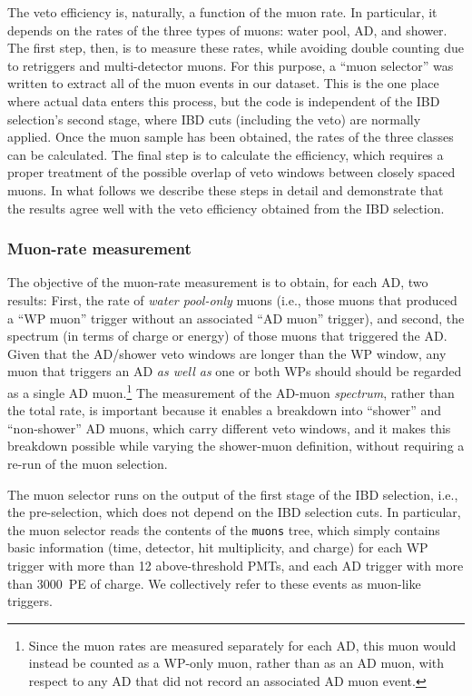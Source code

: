 \documentclass[../thesis.tex]{subfiles}
\begin{document}
The veto efficiency is, naturally, a function of the muon rate. In particular, it depends on the rates of the three types of muons: water pool, AD, and shower. The first step, then, is to measure these rates, while avoiding double counting due to retriggers and multi-detector muons. For this purpose, a ``muon selector'' was written to extract all of the muon events in our dataset. This is the one place where actual data enters this process, but the code is independent of the IBD selection's second stage, where IBD cuts (including the veto) are normally applied. Once the muon sample has been obtained, the rates of the three classes can be calculated. The final step is to calculate the efficiency, which requires a proper treatment of the possible overlap of veto windows between closely spaced muons. In what follows we describe these steps in detail and demonstrate that the results agree well with the veto efficiency obtained from the IBD selection.

\subsubsection{Muon-rate measurement}%
\label{sec:cutVaryMuRate}

The objective of the muon-rate measurement is to obtain, for each AD, two results: First, the rate of \emph{water pool-only} muons (i.e., those muons that produced a ``WP muon'' trigger without an associated ``AD muon'' trigger), and second, the spectrum (in terms of charge or energy) of those muons that triggered the AD\@. Given that the AD/shower veto windows are longer than the WP window, any muon that triggers an AD \emph{as well as} one or both WPs should should be regarded as a single AD muon.\footnote{Since the muon rates are measured separately for each AD, this muon would instead be counted as a WP-only muon, rather than as an AD muon, with respect to any AD that did not record an associated AD muon event.} The measurement of the AD-muon \emph{spectrum}, rather than the total rate, is important because it enables a breakdown into ``shower'' and ``non-shower'' AD muons, which carry different veto windows, and it makes this breakdown possible while varying the shower-muon definition, without requiring a re-run of the muon selection.

The muon selector runs on the output of the first stage of the IBD selection, i.e., the pre-selection, which does not depend on the IBD selection cuts. In particular, the muon selector reads the contents of the \texttt{muons} tree, which simply contains basic information (time, detector, hit multiplicity, and charge) for each WP trigger with more than 12 above-threshold PMTs, and each AD trigger with more than 3000~PE of charge. We collectively refer to these events as muon-like triggers.
\end{document}
